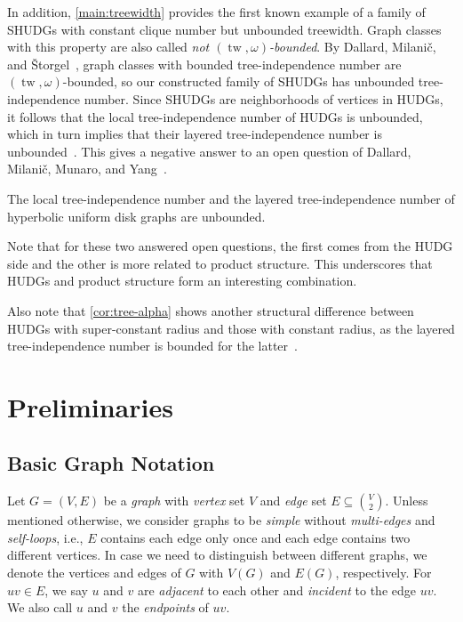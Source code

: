 \documentclass[a4paper,english,cleveref,thm-restate]{lipics-v2021}
\DeclareMathOperator{\tw}{tw}
\begin{document}
In addition, \cref{main:treewidth} provides the first known example of a family of SHUDGs with constant clique number but unbounded treewidth.
Graph classes with this property are also called \emph{not $ (\tw, \omega) $-bounded}.
%
By Dallard, Milanič, and Štorgel~\cite{dallard_tree-alpha_2024}, graph classes with bounded tree-independence number are $ (\tw, \omega) $-bounded, so our constructed family of SHUDGs has unbounded tree-independence number.
Since SHUDGs are neighborhoods of vertices in HUDGs, it follows that the local tree-independence number of HUDGs is unbounded, which in turn implies that their layered tree-independence number is unbounded~\cite{galby_local-tree-alpha_2024}.
This gives a negative answer to an open question of Dallard, Milanič, Munaro, and Yang~\cite{dallard_layered-tree-alpha_2025}.

\begin{corollary}\label{cor:tree-alpha}
    The local tree-independence number and the layered tree-independence number of hyperbolic uniform disk graphs are unbounded.
\end{corollary}

Note that for these two answered open questions, the first comes from the HUDG side and the other is more related to product structure.
This underscores that HUDGs and product structure form an interesting combination.

Also note that \cref{cor:tree-alpha} shows another structural difference between HUDGs with super-constant radius and those with constant radius, as the layered tree-independence number is bounded for the latter~\cite{dallard_layered-tree-alpha_2025}.


% 







\section{Preliminaries}\label{sec:preliminaries}

\subsection{Basic Graph Notation}

Let $G = (V, E)$ be a \emph{graph} with \emph{vertex} set $V$ and \emph{edge} set $E \subseteq \binom{V}{2}$.
Unless mentioned otherwise, we consider graphs to be \emph{simple} without \emph{multi-edges} and \emph{self-loops}, i.e., $E$ contains each edge only once and each edge contains two different vertices.
In case we need to distinguish between different graphs, we denote the vertices and edges of $G$ with $V(G)$ and $E(G)$, respectively.
For $uv \in E$, we say $u$ and $v$ are \emph{adjacent} to each other and \emph{incident} to the edge $uv$.
We also call $u$ and $v$ the \emph{endpoints} of $uv$.
\end{document}
